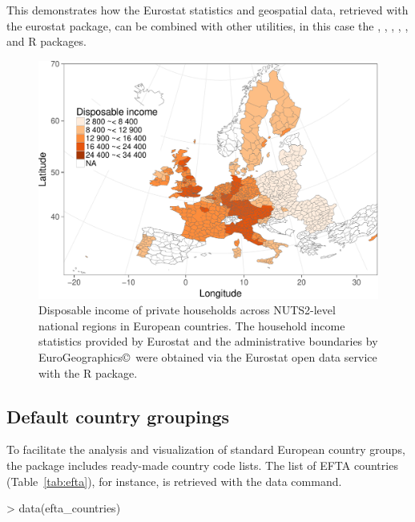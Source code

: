 This demonstrates how the Eurostat statistics and geospatial data,
retrieved with the eurostat package, can be combined with other
utilities, in this case the
 \citep{grid},  \citep{maptools},  \citep{rgdal},
 \citep{rgeos},  \citep{scales}, and
 \citep{stringr} R packages.

\begin{figure}
\begin{center}
\includegraphics{2015-manu-mapexample-1}
\caption{Disposable income of private households across NUTS2-level national regions in European countries. The household income statistics provided by Eurostat and the administrative boundaries by EuroGeographics\copyright \  were obtained via the Eurostat open data service with the  R package.}
\label{fig:mapexample}
\end{center}
\end{figure}


\subsection{Default country groupings}

To facilitate the analysis and visualization of standard European
country groups, the  package includes ready-made
country code lists. The list of EFTA countries (Table~\ref{tab:efta}),
for instance, is retrieved with the data command.

\begin{example}
> data(efta_countries)
\end{example}

